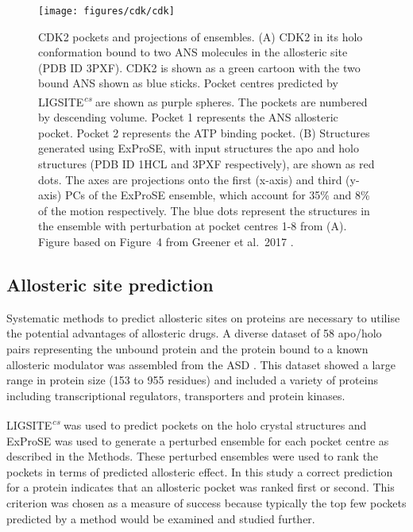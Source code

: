 \begin{figure}
\centering

\texttt{[image: figures/cdk/cdk]}

\caption[CDK2 pockets and projections of perturbed ExProSE ensembles]
{CDK2 pockets and projections of ensembles.
(A) CDK2 in its holo conformation bound to two ANS molecules in the allosteric site (PDB ID 3PXF).
CDK2 is shown as a green cartoon with the two bound ANS shown as blue sticks.
Pocket centres predicted by LIGSITE\textsuperscript{\it cs} are shown as purple spheres.
The pockets are numbered by descending volume.
Pocket 1 represents the ANS allosteric pocket.
Pocket 2 represents the ATP binding pocket.
(B) Structures generated using ExProSE, with input structures the apo and holo structures (PDB ID 1HCL and 3PXF respectively), are shown as red dots.
The axes are projections onto the first (x-axis) and third (y-axis) PCs of the ExProSE ensemble, which account for 35\% and 8\% of the motion respectively.
The blue dots represent the structures in the ensemble with perturbation at pocket centres 1-8 from (A).
Figure based on Figure~4 from Greener et al.\ 2017 \cite{Greener2017}.}

\label{fig:cdk}
\end{figure}


\subsection{Allosteric site prediction}

Systematic methods to predict allosteric sites on proteins are necessary to utilise the potential advantages of allosteric drugs.
A diverse dataset of 58 apo/holo pairs representing the unbound protein and the protein bound to a known allosteric modulator was assembled from the ASD \cite{Shen2016}.
This dataset showed a large range in protein size (153 to 955 residues) and included a variety of proteins including transcriptional regulators, transporters and protein kinases.

LIGSITE\textsuperscript{\it cs} was used to predict pockets on the holo crystal structures and ExProSE was used to generate a perturbed ensemble for each pocket centre as described in the Methods.
These perturbed ensembles were used to rank the pockets in terms of predicted allosteric effect.
In this study a correct prediction for a protein indicates that an allosteric pocket was ranked first or second.
This criterion was chosen as a measure of success because typically the top few pockets predicted by a method would be examined and studied further.

